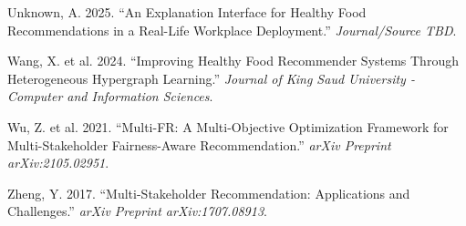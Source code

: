 \documentclass[
  letterpaper,
  DIV=11,
  numbers=noendperiod]{scrartcl}
\newlength{\cslhangindent}
\newenvironment{CSLReferences}[2] %
 {\begin{list}{}{%
  \setlength{\itemindent}{0pt}
  \setlength{\leftmargin}{0pt}
  \setlength{\parsep}{0pt}
  \ifodd #1
   \setlength{\leftmargin}{\cslhangindent}
   \setlength{\itemindent}{-1\cslhangindent}
  \fi
  \setlength{\itemsep}{#2\baselineskip}}}
 {\end{list}}
\begin{document}
\begin{CSLReferences}{1}{1}
Unknown, A. 2025. {``An Explanation Interface for Healthy Food
Recommendations in a Real-Life Workplace Deployment.''}
\emph{Journal/Source TBD}.

{Wang, X. et al.} 2024. {``Improving Healthy Food Recommender Systems
Through Heterogeneous Hypergraph Learning.''} \emph{Journal of King Saud
University - Computer and Information Sciences}.

{Wu, Z. et al.} 2021. {``Multi-FR: A Multi-Objective Optimization
Framework for Multi-Stakeholder Fairness-Aware Recommendation.''}
\emph{arXiv Preprint arXiv:2105.02951}.

Zheng, Y. 2017. {``Multi-Stakeholder Recommendation: Applications and
Challenges.''} \emph{arXiv Preprint arXiv:1707.08913}.

\end{CSLReferences}
\end{document}
